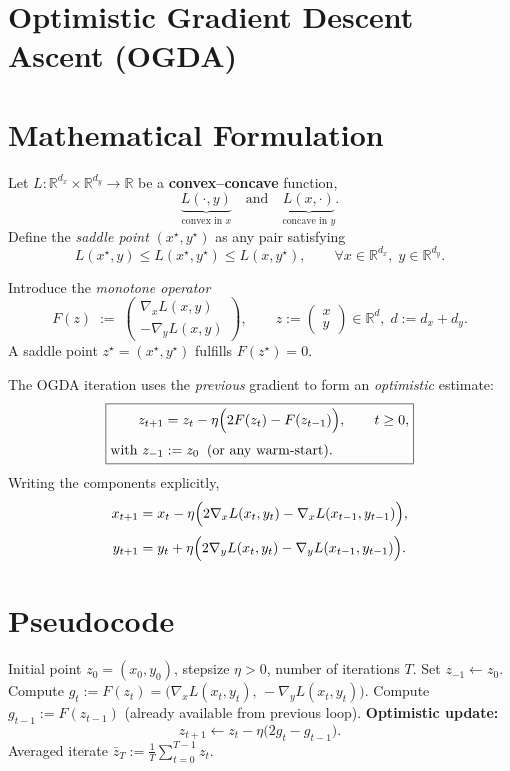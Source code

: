 \documentclass{article}
\begin{document}
\section*{Optimistic Gradient Descent Ascent (OGDA)}

\section*{Mathematical Formulation}
Let $L:\mathbb{R}^{d_x}\times\mathbb{R}^{d_y}\to\mathbb{R}$ be a \textbf{convex--concave} function,
\[
\underbrace{L(\cdot ,y)}_{\text{convex in }x}\quad\text{and}\quad
\underbrace{L(x,\cdot)}_{\text{concave in }y}.
\]
Define the \emph{saddle point} $(x^\star ,y^\star)$ as any pair satisfying
\[
L(x^\star ,y)\le L(x^\star ,y^\star)\le L(x ,y^\star),\qquad\forall x\in\mathbb{R}^{d_x},\;y\in\mathbb{R}^{d_y}.
\]

Introduce the \emph{monotone operator}
\[
F(z)\;:=\;\begin{pmatrix}
\nabla_x L(x,y)\\[2mm]
-\nabla_y L(x,y)
\end{pmatrix},
\qquad 
z:=\begin{pmatrix}x\\y\end{pmatrix}\in\mathbb{R}^{d},\;d:=d_x+d_y .
\]
A saddle point $z^\star=(x^\star ,y^\star)$ fulfills $F(z^\star)=0$.

The OGDA iteration uses the \emph{previous} gradient to form an \emph{optimistic} estimate:
\[
\boxed{
\begin{aligned}
z_{t+1}&=z_t-\eta\Bigl(2F(z_t)-F(z_{t-1})\Bigr),\qquad t\ge 0,\\[1mm]
\text{with }z_{-1}&:=z_0\;\;(\text{or any warm‑start}).
\end{aligned}}
\]
Writing the components explicitly,
\[
\begin{aligned}
x_{t+1}&=x_t-\eta\Bigl(2\nabla_x L(x_t,y_t)-\nabla_x L(x_{t-1},y_{t-1})\Bigr),\\[1mm]
y_{t+1}&=y_t+\eta\Bigl(2\nabla_y L(x_t,y_t)-\nabla_y L(x_{t-1},y_{t-1})\Bigr).
\end{aligned}
\]

\section*{Pseudocode}
\begin{algorithm}[H]
\caption{Optimistic Gradient Descent Ascent (OGDA)}
\begin{algorithmic}[1]
\REQUIRE Initial point $z_0=(x_0,y_0)$, stepsize $\eta>0$, number of iterations $T$.
\STATE Set $z_{-1}\gets z_0$.
    \STATE Compute $g_t:=F(z_t)=\bigl(\nabla_x L(x_t,y_t),\,-\nabla_y L(x_t,y_t)\bigr)$.
    \STATE Compute $g_{t-1}:=F(z_{t-1})$ (already available from previous loop).
    \STATE \textbf{Optimistic update:}
    \[
    z_{t+1}\gets z_t-\eta\bigl(2g_t-g_{t-1}\bigr).
    \]
\ENDFOR
\RETURN Averaged iterate $\displaystyle\bar z_T:=\frac1T\sum_{t=0}^{T-1}z_t$.
\end{algorithmic}
\end{algorithm}
\end{document}
